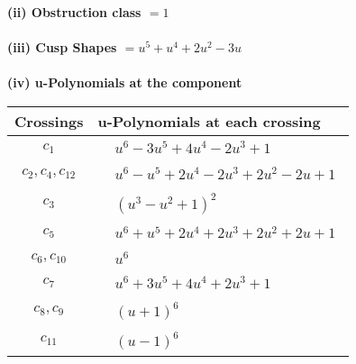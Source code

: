 \documentclass[1p]{elsarticle_modified}
\theoremstyle{definition}
\begin{document}
\flushleft \textbf{(ii) Obstruction class $= 1$}\\~\\
\flushleft \textbf{(iii) Cusp Shapes $= u^5+u^4+2 u^2-3 u$}\\~\\
\newpage\renewcommand{\arraystretch}{1}
\flushleft \textbf{(iv) u-Polynomials at the component}\newline \\
\begin{tabular}{m{50pt}|m{274pt}}
Crossings & \hspace{64pt}u-Polynomials at each crossing \\
\hline $$\begin{aligned}c_{1}\end{aligned}$$&$\begin{aligned}
&u^6-3 u^5+4 u^4-2 u^3+1
\end{aligned}$\\
\hline $$\begin{aligned}c_{2},c_{4},c_{12}\end{aligned}$$&$\begin{aligned}
&u^6- u^5+2 u^4-2 u^3+2 u^2-2 u+1
\end{aligned}$\\
\hline $$\begin{aligned}c_{3}\end{aligned}$$&$\begin{aligned}
&(u^3- u^2+1)^2
\end{aligned}$\\
\hline $$\begin{aligned}c_{5}\end{aligned}$$&$\begin{aligned}
&u^6+u^5+2 u^4+2 u^3+2 u^2+2 u+1
\end{aligned}$\\
\hline $$\begin{aligned}c_{6},c_{10}\end{aligned}$$&$\begin{aligned}
&u^6
\end{aligned}$\\
\hline $$\begin{aligned}c_{7}\end{aligned}$$&$\begin{aligned}
&u^6+3 u^5+4 u^4+2 u^3+1
\end{aligned}$\\
\hline $$\begin{aligned}c_{8},c_{9}\end{aligned}$$&$\begin{aligned}
&(u+1)^6
\end{aligned}$\\
\hline $$\begin{aligned}c_{11}\end{aligned}$$&$\begin{aligned}
&(u-1)^6
\end{aligned}$\\
\hline
\end{tabular}\\~\\
\end{document}
